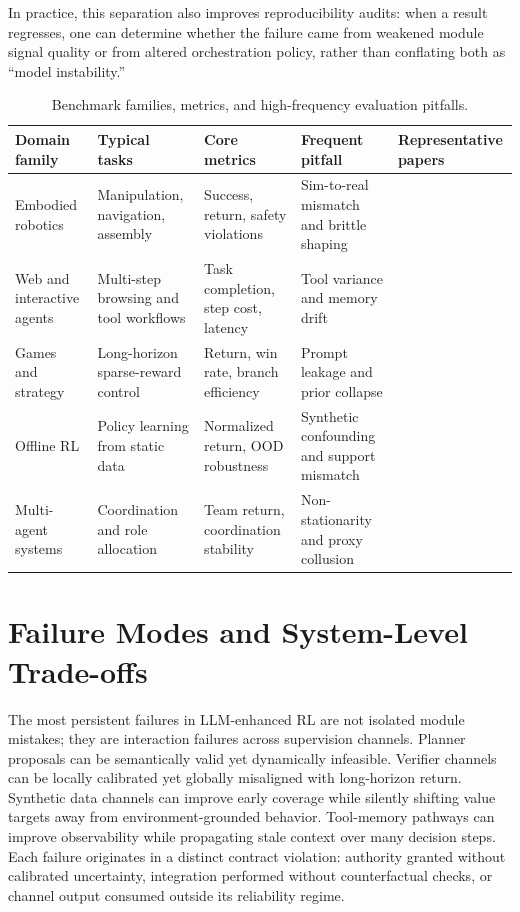 \documentclass[pdflatex,sn-mathphys-num]{sn-jnl}
\begin{document}
In practice, this separation also improves reproducibility audits: when a result regresses, one can determine whether the failure came from weakened module signal quality or from altered orchestration policy, rather than conflating both as ``model instability.''

\begin{table}[t]
\centering
\small
\setlength{\tabcolsep}{4pt}
\begin{tabularx}{\textwidth}{P{1.9cm}P{2.5cm}P{2.1cm}P{2.2cm}Y}
\toprule
\textbf{Domain family} & \textbf{Typical tasks} & \textbf{Core metrics} & \textbf{Frequent pitfall} & \textbf{Representative papers}\\
\midrule
Embodied robotics & Manipulation, navigation, assembly & Success, return, safety violations & Sim-to-real mismatch and brittle shaping & \cite{arxiv_p_2204_01691,arxiv_p_2602_02454,arxiv_p_2602_12099}\\
Web and interactive agents & Multi-step browsing and tool workflows & Task completion, step cost, latency & Tool variance and memory drift & \cite{arxiv_p_2404_03648,arxiv_p_2601_02439,arxiv_p_2601_03555}\\
Games and strategy & Long-horizon sparse-reward control & Return, win rate, branch efficiency & Prompt leakage and prior collapse & \cite{arxiv_p_2305_16291,arxiv_p_2602_07848,arxiv_p_2602_14234}\\
Offline RL & Policy learning from static data & Normalized return, OOD robustness & Synthetic confounding and support mismatch & \cite{arxiv_p_2310_20587,arxiv_p_2505_18098,arxiv_p_2601_08107}\\
Multi-agent systems & Coordination and role allocation & Team return, coordination stability & Non-stationarity and proxy collusion & \cite{arxiv_p_2304_07297,arxiv_p_2602_08335,arxiv_p_2602_11583}\\
\bottomrule
\end{tabularx}
\caption{Benchmark families, metrics, and high-frequency evaluation pitfalls.}
\label{tab:t5_benchmarks}
\end{table}

\section{Failure Modes and System-Level Trade-offs}
The most persistent failures in LLM-enhanced RL are not isolated module mistakes; they are interaction failures across supervision channels. Planner proposals can be semantically valid yet dynamically infeasible. Verifier channels can be locally calibrated yet globally misaligned with long-horizon return. Synthetic data channels can improve early coverage while silently shifting value targets away from environment-grounded behavior. Tool-memory pathways can improve observability while propagating stale context over many decision steps. Each failure originates in a distinct contract violation: authority granted without calibrated uncertainty, integration performed without counterfactual checks, or channel output consumed outside its reliability regime.
\end{document}
